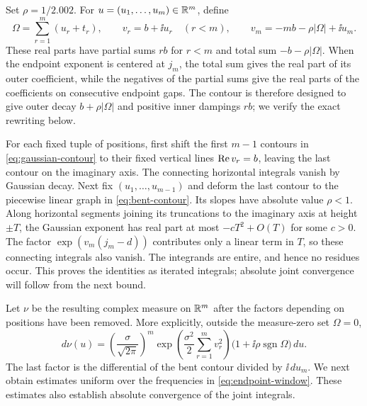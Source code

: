 Set $\rho=1/2.002$. For $u=(u_1,\ldots,u_m)\in\mathbb R^m$, define
\begin{equation}
 \Omega=\sum_{r=1}^m(u_r+t_r),\qquad
 v_r=b+\ii u_r\quad(r<m),\qquad
 v_m=-mb-\rho|\Omega|+\ii u_m.
 \label{eq:bent-contour}
\end{equation}
These real parts have partial sums $rb$ for $r<m$ and total sum
$-b-\rho|\Omega|$. When the endpoint exponent is centered at $j_m$,
the total sum gives the real part of its outer coefficient, while the
negatives of the partial sums give the real parts of the coefficients
on consecutive endpoint gaps. The contour is
therefore designed to give outer decay $b+\rho|\Omega|$ and positive
inner dampings $rb$; we verify the exact rewriting below.

For each fixed tuple of positions, first shift the first $m-1$ contours
in \eqref{eq:gaussian-contour} to their fixed vertical lines
$\operatorname{Re} v_r=b$, leaving the last contour on the imaginary axis.
The connecting horizontal integrals vanish by Gaussian decay.
Next fix $(u_1,\ldots,u_{m-1})$ and deform the last contour to the
piecewise linear graph in \eqref{eq:bent-contour}. Its slopes have
absolute value $\rho<1$. Along horizontal segments joining its
truncations to the imaginary axis at height $\pm T$, the Gaussian
exponent has real part at most $-cT^2+O(T)$ for some $c>0$.
The factor $\exp(v_m(j_m-d))$ contributes only a linear term in $T$,
so these connecting integrals also vanish. The integrands are entire,
and hence no residues occur. This proves the identities as iterated
integrals; absolute joint convergence will follow from the next bound.

Let $\nu$ be the resulting complex measure on $\mathbb R^m$ after the factors
depending on positions have been removed. More explicitly, outside the
measure-zero set $\Omega=0$,
\begin{equation}
 d\nu(u)=
 \left(\frac{\sigma}{\sqrt{2\pi}}\right)^m
 \exp\left(\frac{\sigma^2}{2}\sum_{r=1}^m v_r^2\right)
 \bigl(1+\ii\rho\operatorname{sgn}\Omega\bigr)\,du.
 \label{eq:contour-measure}
\end{equation}
The last factor is the differential of the bent contour divided by
$\ii\,du_m$. We next obtain estimates uniform over the frequencies in
\eqref{eq:endpoint-window}. These estimates also establish absolute
convergence of the joint integrals.

